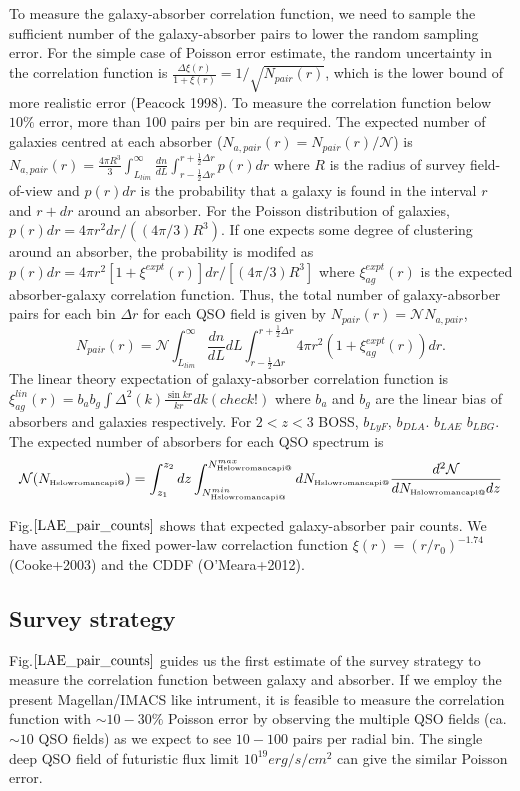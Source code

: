 \documentclass[useAMS,usenatbib,twocolumn]{mn2e}
\makeatletter
\newcommand{\Rmnum}[1]{\expandafter\@slowromancap\romannumeral #1@}
\newcommand{\NHI}{N_{\mbox{\tiny H\Rmnum{1}}}}
\makeatother
\begin{document}
To measure the galaxy-absorber correlation function, we need to sample
the sufficient number of the galaxy-absorber pairs to lower the random
sampling error. For the simple case of Poisson error estimate, the random 
uncertainty in the correlation function is $\frac{\Delta \xi(r)}{1+\xi(r)}
=1/\sqrt{N_{pair}(r)}$, which is the lower bound of more realistic error 
(Peacock 1998). To measure the correlation function below $10\%$ error,
more than 100 pairs per bin are required. The expected number of galaxies 
centred at each absorber ($N_{a,pair}(r)=N_{pair}(r)/\mathcal{N}$) is 
$N_{a,pair}(r)=\frac{4\pi R^3}{3}\int_{L_{lim}}^\infty\frac{dn}{dL}
\int_{r-\frac{1}{2}\Delta r}^{r+\frac{1}{2}\Delta r}p(r)dr$ where $R$ is the radius
of survey field-of-view and $p(r)dr$ is the 
probability that a galaxy is found in the interval $r$ and $r+dr$ around an 
absorber. For the Poisson distribution of galaxies, 
$p(r)dr=4\pi r^2dr/((4\pi/3)R^3)$. If one expects some degree of clustering
around an absorber, the probability is modifed as 
$p(r)dr=4\pi r^2[1+\xi^{expt}(r)] dr/[(4\pi/3)R^3]$ where $\xi^{expt}_{ag}(r)$ 
is the expected absorber-galaxy correlation function.
Thus, the total number of galaxy-absorber pairs for each bin $\Delta r$ for
each QSO field is given by $N_{pair}(r)=\mathcal{N}N_{a,pair}$,
\begin{equation}
N_{pair}(r)=\mathcal{N}\int_{L_{lim}}^\infty\frac{dn}{dL}dL
\int_{r-\frac{1}{2}\Delta r}^{r+\frac{1}{2}\Delta r}
4\pi r^2\left(1+\xi^{expt}_{ag}(r)\right)dr.
\end{equation}
The linear theory expectation of galaxy-absorber correlation function is 
$\xi_{ag}^{lin}(r)=b_ab_g\int \Delta^2(k)\frac{\sin kr}{kr}dk (check!)$
where $b_a$ and $b_g$ are the linear bias of absorbers and galaxies 
respectively. For $2<z<3$ BOSS, $b_{LyF}$, $b_{DLA}$. $b_{LAE}$ $b_{LBG}$. 
The expected number of absorbers for each QSO spectrum is
\begin{equation}
\mathcal{N}(\NHI)=\int_{z_1}^{z_2}dz\int_{\NHI^{min}}^{\NHI^{max}}d\NHI 
\frac{d^2\mathcal{N}}{d\NHI dz}
\end{equation}

Fig.$\ref{LAE_pair_counts}$ shows that expected galaxy-absorber pair
counts. We have assumed the fixed power-law correlaction function
$\xi(r)=(r/r_0)^{-1.74}$ (Cooke+2003) and the CDDF (O'Meara+2012).

\subsection{Survey strategy}
Fig.$\ref{LAE_pair_counts}$ guides us the first estimate of the survey
strategy to measure the correlation function between galaxy and absorber.
If we employ the present Magellan/IMACS like intrument, it is feasible
to measure the correlation function with $\sim10-30\%$ Poisson error by
observing the multiple QSO fields (ca. $\sim 10$ QSO fields) as we expect
to see $10-100$ pairs per radial bin.
The single deep QSO field of futuristic flux limit $10^{19}erg/s/cm^2$
can give the similar Poisson error.
\end{document}
